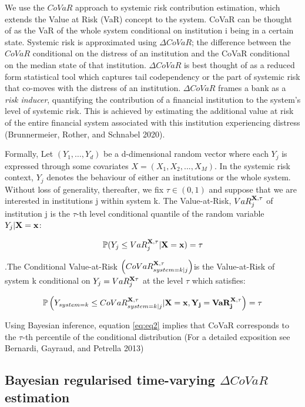 \documentclass[
  10pt,
]{article}
\begin{document}
We use the \(CoVaR\) approach to systemic risk contribution estimation,
which extends the Value at Risk (VaR) concept to the system. CoVaR can
be thought of as the VaR of the whole system conditional on institution
i being in a certain state. Systemic risk is approximated using
\(\Delta CoVaR\); the difference between the \(CoVaR\) conditional on
the distress of an institution and the CoVaR conditional on the median
state of that institution. \(\Delta CoVaR\) is best thought of as a
reduced form statistical tool which captures tail codependency or the
part of systemic risk that co-moves with the distress of an institution.
\(\Delta CoVaR\) frames a bank as a \emph{risk inducer}, quantifying the
contribution of a financial institution to the system's level of
systemic risk. This is achieved by estimating the additional value at
risk of the entire financial system associated with this institution
experiencing distress (Brunnermeier, Rother, and Schnabel 2020).

Formally, Let \((Y_1,\dots,Y_d)\) be a d-dimensional random vector where
each \(Y_j\) is expressed through some covariates
\(X= (X_1,X_2,...,X_M)\). In the systemic risk context, \(Y_j\) denotes
the behaviour of either an institutions or the whole system. Without
loss of generality, thereafter, we fix \(\tau \in (0,1)\) and suppose
that we are interested in institutions j within system k. The
Value-at-Risk, \(VaR^{\bf{X},\tau}_j\) of institution j is the
\(\tau\)-th level conditional quantile of the random variable
\(Y_j|\bf{X}=x\):

\begin{equation}\label{eq:eq1}
\mathbb{P}(Y_j \leq VaR^{\bf{X},\tau}_j |\bf{X}=x)=\tau
\end{equation}

.The Conditional Value-at-Risk
\(\left( CoVaR_{system=k|j}^{\bf{X},\tau} \right)\)is the Value-at-Risk
of system k conditional on \(Y_j= VaR_j^{\bf{X}\tau}\) at the level
\(\tau\) which satisfies:

\begin{equation}\label{eq:eq2}
\mathbb{P}\left(Y_{system=k} \leq CoVaR_{system=k|j}^{\bf{X},\tau} |\bf{X}=x,Y_j=VaR^{\bf{X},\tau}_j \right)=\tau
\end{equation}

Using Bayesian inference, equation \ref{eq:eq2} implies that CoVaR
corresponds to the \(\tau\)-th percentile of the conditional
distribution (For a detailed exposition see Bernardi, Gayraud, and
Petrella 2013)

\hypertarget{bayesian-regularised-time-varying-delta-covar-estimation}{%
\subsection{\texorpdfstring{Bayesian regularised time-varying
\(\Delta CoVaR\)
estimation}{Bayesian regularised time-varying \textbackslash Delta CoVaR estimation}}\label{bayesian-regularised-time-varying-delta-covar-estimation}}
\end{document}
